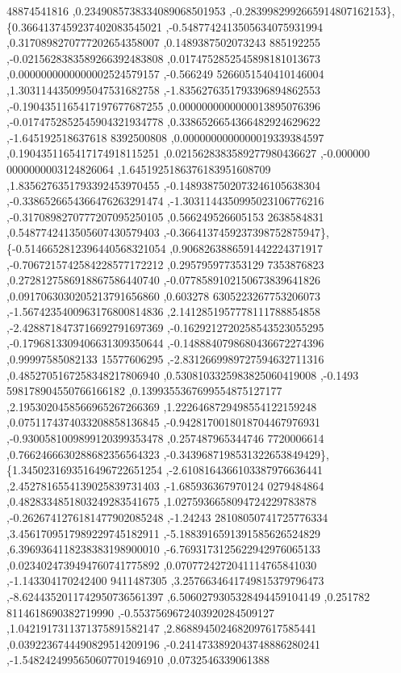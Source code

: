 \begin{DoxyCode}
      48874541816 ,0.2349085738334089068501953 ,-0.2839982992665914807162153\},
\{0.3664137459237402083545021 ,-0.5487742413505634075931994 ,0.3170898270777202654358007 ,0.1489387502073243
      885192255 ,-0.0215628383589266392483808 ,0.0174752852545898181013673 ,0.0000000000000002524579157 ,-0.566249
      5266051540410146004 ,1.3031144350995047531682758 ,-1.8356276351793396894862553 ,-0.1904351165417197677687255
       ,0.0000000000000013895076396 ,-0.0174752852545904321934778 ,0.3386526654366482924629622 ,-1.645192518637618
      8392500808 ,0.0000000000000019339384597 ,0.1904351165417174918115251 ,0.0215628383589277980436627 ,-0.000000
      0000000003124826064 ,1.6451925186376183951608709 ,1.8356276351793392453970455 ,-0.1489387502073246105638304 
      ,-0.3386526654366476263291474 ,-1.3031144350995023106776216 ,-0.3170898270777207095250105 ,0.566249526605153
      2638584831 ,0.5487742413505607430579403 ,-0.3664137459237398752875947\},
\{-0.5146652812396440568321054 ,0.9068263886591442224371917 ,-0.7067215742584228577172212 ,0.295795977353129
      7353876823 ,0.2728127586918867586440740 ,-0.0778589102150673839641826 ,0.0917063030205213791656860 ,0.603278
      6305223267753206073 ,-1.5674235400963176800814836 ,2.1412851957778111788854858 ,-2.4288718473716692791697369
       ,-0.1629212720258543523055295 ,-0.1796813309406631309350644 ,-0.1488840798680436672274396 ,0.99997585082133
      15577606295 ,-2.8312669989727594632711316 ,0.4852705167258348217806940 ,0.5308103325983825060419008 ,-0.1493
      598178904550766166182 ,0.1399355367699554875127177 ,2.1953020458566965267266369 ,1.2226468729498554122159248
       ,0.0751174374033208858136845 ,-0.9428170018018704467976931 ,-0.9300581009899120399353478 ,0.257487965344746
      7720006614 ,0.7662466630288682356564323 ,-0.3439687198531322653849429\},
\{1.3450231693516496722651254 ,-2.6108164366103387976636441 ,2.4527816554139025839731403 ,-1.685936367970124
      0279484864 ,0.4828334851803249283541675 ,1.0275936658094724229783878 ,-0.2626741276181477902085248 ,-1.24243
      28108050741725776334 ,3.4561709517989229745182911 ,-5.1883916591391585626524829 ,6.3969364118238383198900010
       ,-6.7693173125622942976065133 ,0.0234024739494760741775892 ,0.0707724272041114765841030 ,-1.143304170242400
      9411487305 ,3.2576634641749815379796473 ,-8.6244352011742950736561397 ,6.5060279305328494459104149 ,0.251782
      8114618690382719990 ,-0.5537569672403920284509127 ,1.0421917311371375891582147 ,2.8688945024682097617585441 
      ,0.0392236744490829514209196 ,-0.2414733892043748886280241 ,-1.5482424995650607701946910 ,0.0732546339061388

\end{DoxyCode}
